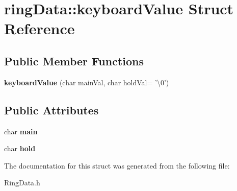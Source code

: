 \hypertarget{structring_data_1_1keyboard_value}{\section{ring\+Data\+:\+:keyboard\+Value Struct Reference}
\label{structring_data_1_1keyboard_value}
}
\subsection*{Public Member Functions}
\begin{DoxyCompactItemize}
\item 
\hypertarget{structring_data_1_1keyboard_value_aa3b2165c93b60a5d3fe596d96df89dc2}{{\bfseries keyboard\+Value} (char main\+Val, char hold\+Val= '\textbackslash{}0')}\label{structring_data_1_1keyboard_value_aa3b2165c93b60a5d3fe596d96df89dc2}

\end{DoxyCompactItemize}
\subsection*{Public Attributes}
\begin{DoxyCompactItemize}
\item 
\hypertarget{structring_data_1_1keyboard_value_ae3241b65c84f31df2350d7211f150521}{char {\bfseries main}}\label{structring_data_1_1keyboard_value_ae3241b65c84f31df2350d7211f150521}

\item 
\hypertarget{structring_data_1_1keyboard_value_a5b23ed6feefce0f791fdf01217ac0dbe}{char {\bfseries hold}}\label{structring_data_1_1keyboard_value_a5b23ed6feefce0f791fdf01217ac0dbe}

\end{DoxyCompactItemize}


The documentation for this struct was generated from the following file\+:\begin{DoxyCompactItemize}
\item 
Ring\+Data.\+h\end{DoxyCompactItemize}
